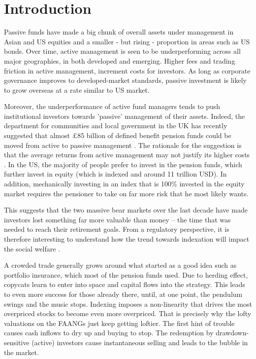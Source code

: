 

\chapter{Introduction}
Passive funds have made a big chunk of overall assets under management in Asian and US equities and a smaller - but rising - proportion in areas such as US bonds. Over time, active management is seen to be underperforming across all major geographies, in both developed and emerging. Higher fees and trading friction in active management, increment costs for investors. As long as corporate governance improves to developed-market standards, passive investment is likely to grow overseas at a rate similar to US market.

Moreover, the underperformance of active fund managers tends to push institutional investors towards 'passive' management of their assets. Indeed, the department for communities and local government in the UK has recently suggested that almost £85 billion of defined benefit pension funds could be moved from active to passive management \cite{a2}. The rationale for the suggestion is that the average returns from active management may not justify its higher costs \cite{a2}. In the US, the majority of people prefer to invest in the pension funds, which further invest in equity (which is indexed and around 11 trillion USD). In addition, mechanically investing in an index that is 100\% invested in the equity market requires the pensioner to take on far more risk that he most likely wants. 

This suggests that the two massive bear markets over the last decade have made investors lost something far more valuable than money – the time that was needed to reach their retirement goals. From a regulatory perspective, it is therefore interesting to understand how the trend towards indexation will impact the social welfare \cite{a1}.

A crowded trade generally grows around what started as a good idea such as portfolio insurance, which most of the pension funds used. Due to herding effect, copycats learn to enter into space and capital flows into the strategy. This leads to even more success for those already there, until, at one point, the pendulum swings and the music stops. Indexing imposes a non-linearity that drives the most overpriced stocks to become even more overpriced. That is precisely why the lofty valuations on the FAANGs just keep getting loftier. The first hint of trouble causes cash inflows to dry up and buying to stop. The redemption by drawdown-sensitive (active) investors cause instantaneous selling and leads to the bubble in the market.

